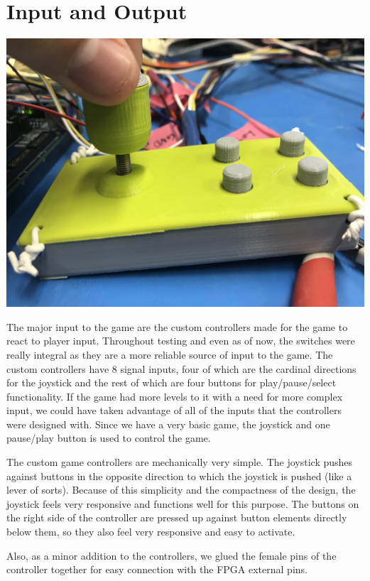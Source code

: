 \documentclass[letterpaper]{article} %
\begin{document}
\section{Input and Output}
	\begin{center}
		\includegraphics[scale=.07]{controller_closeup}
	\end{center}\par
	The major input to the game are the custom controllers made for the game to react to player input. Throughout testing and even as of now, the switches were really integral as they are a more reliable source of input to the game. The custom controllers have 8 signal inputs, four of which are the cardinal directions for the joystick and the rest of which are four buttons for play/pause/select functionality. If the game had more levels to it with a need for more complex input, we could have taken advantage of all of the inputs that the controllers were designed with. Since we have a very basic game, the joystick and one pause/play button is used to control the game. \par
	The custom game controllers are mechanically very simple. The joystick pushes against buttons in the opposite direction to which the joystick is pushed (like a lever of sorts). Because of this simplicity and the compactness of the design, the joystick feels very responsive and functions well for this purpose. The buttons on the right side of the controller are pressed up against button elements directly below them, so they also feel very responsive and easy to activate.\par
	Also, as a minor addition to the controllers, we glued the female pins of the controller together for easy connection with the FPGA external pins. \par
\end{document}
